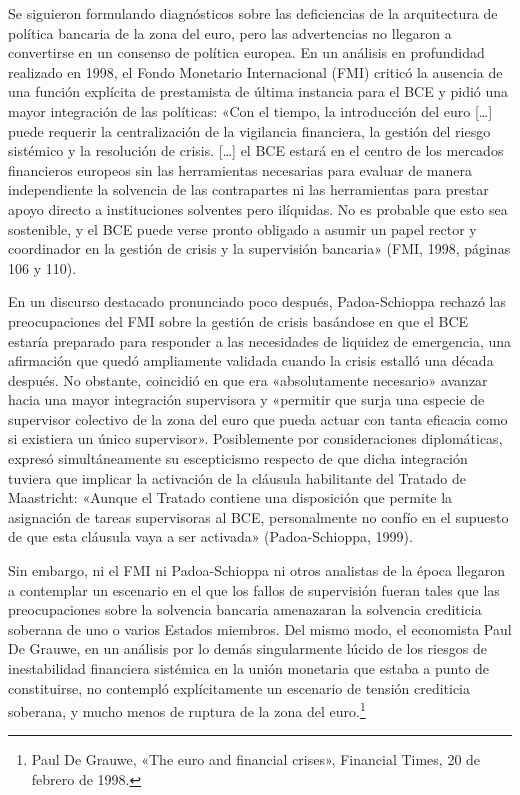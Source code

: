 \documentclass[10pt,a4paper]{article}
\begin{document}
{Se siguieron formulando diagnósticos sobre las deficiencias de la arquitectura de política bancaria de la zona del euro, pero las advertencias no llegaron a convertirse en un consenso de política europea. En un análisis en profundidad realizado en 1998, el Fondo Monetario Internacional (FMI) criticó la ausencia de una función explícita de prestamista de última instancia para el BCE y pidió una mayor integración de las políticas: «Con el tiempo, la introducción del euro […] puede requerir la centralización de la vigilancia financiera, la gestión del riesgo sistémico y la resolución de crisis. […] el BCE estará en el centro de los mercados financieros europeos sin las herramientas necesarias para evaluar de manera independiente la solvencia de las contrapartes ni las herramientas para prestar apoyo directo a instituciones solventes pero ilíquidas. No es probable que esto sea sostenible, y el BCE puede verse pronto obligado a asumir un papel rector y coordinador en la gestión de crisis y la supervisión bancaria» (FMI, 1998, páginas 106 y 110).

En un discurso destacado pronunciado poco después, Padoa-Schioppa rechazó las preocupaciones del FMI sobre la gestión de crisis basándose en que el BCE estaría preparado para responder a las necesidades de liquidez de emergencia, una afirmación que quedó ampliamente validada cuando la crisis estalló una década después. No obstante, coincidió en que era «absolutamente necesario» avanzar hacia una mayor integración supervisora y «permitir que surja una especie de supervisor colectivo de la zona del euro que pueda actuar con tanta eficacia como si existiera un único supervisor». Posiblemente por consideraciones diplomáticas, expresó simultáneamente su escepticismo respecto de que dicha integración tuviera que implicar la activación de la cláusula habilitante del Tratado de Maastricht: «Aunque el Tratado contiene una disposición que permite la asignación de tareas supervisoras al BCE, personalmente no confío en el supuesto de que esta cláusula vaya a ser activada» (Padoa-Schioppa, 1999).

Sin embargo, ni el FMI ni Padoa-Schioppa ni otros analistas de la época llegaron a contemplar un escenario en el que los fallos de supervisión fueran tales que las preocupaciones sobre la solvencia bancaria amenazaran la solvencia crediticia soberana de uno o varios Estados miembros. Del mismo modo, el economista Paul De Grauwe, en un análisis por lo demás singularmente lúcido de los riesgos de inestabilidad financiera sistémica en la unión monetaria que estaba a punto de constituirse, no contempló explícitamente un escenario de tensión crediticia soberana, y mucho menos de ruptura de la zona del euro.\footnote{
Paul De Grauwe, «The euro and financial crises», Financial Times, 20 de febrero de 1998.
}

}
\end{document}
